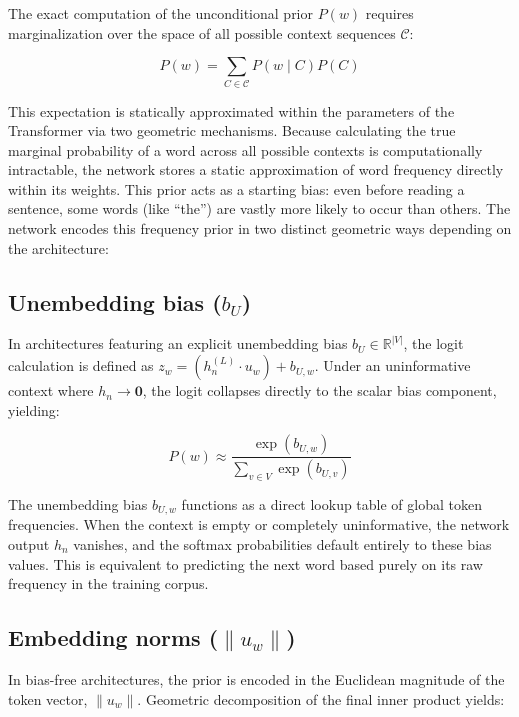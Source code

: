 \documentclass[11pt,a4paper]{article}
\begin{document}
	The exact computation of the unconditional prior $P(w)$ requires marginalization over the space of all possible context sequences $\mathcal{C}$:
	
	\begin{equation}
		P(w) = \sum_{C \in \mathcal{C}} P(w \mid C)P(C)
	\end{equation}
	
	This expectation is statically approximated within the parameters of the Transformer via two geometric mechanisms. Because calculating the true marginal probability of a word across all possible contexts is computationally intractable, the network stores a static approximation of word frequency directly within its weights. This prior acts as a starting bias: even before reading a sentence, some words (like ``the'') are vastly more likely to occur than others. The network encodes this frequency prior in two distinct geometric ways depending on the architecture:
	
	\subsection{Unembedding bias \texorpdfstring{($b_U$)}{(b\_U)}}
	In architectures featuring an explicit unembedding bias $b_U \in \mathbb{R}^{|V|}$, the logit calculation is defined as $z_w = (h_n^{(L)} \cdot u_w) + b_{U,w}$. Under an uninformative context where $h_n \to \mathbf{0}$, the logit collapses directly to the scalar bias component, yielding:
	
	\begin{equation}
		P(w) \approx \frac{\exp(b_{U,w})}{\sum_{v \in V} \exp(b_{U,v})}
	\end{equation}
	
	The unembedding bias $b_{U,w}$ functions as a direct lookup table of global token frequencies. When the context is empty or completely uninformative, the network output $h_n$ vanishes, and the softmax probabilities default entirely to these bias values. This is equivalent to predicting the next word based purely on its raw frequency in the training corpus.
	
	\subsection{Embedding norms \texorpdfstring{($\|u_w\|$)}{(||u\_w||)}}
	In bias-free architectures, the prior is encoded in the Euclidean magnitude of the token vector, $\|u_w\|$. Geometric decomposition of the final inner product yields:
	
\end{document}
